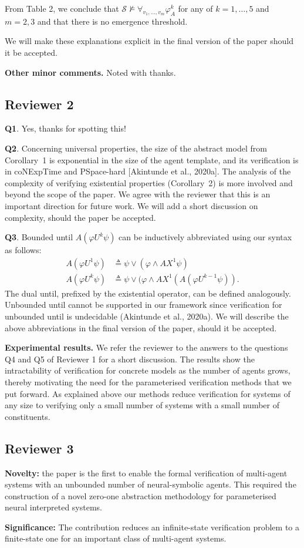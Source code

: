 \documentclass{article}
\begin{document}
From Table 2, we conclude that
$\mathcal{S}\not\models\forall_{v_1,\dots,v_m}\varphi^k_A$ for any of
$k=1,\dots,5$ and $m=2,3$ and that there is no emergence threshold.

We will make these explanations explicit in the final
version of the paper should it be accepted.

\textbf{Other minor comments.} Noted with thanks.


\subsection*{Reviewer 2}

\textbf{Q1}. Yes, thanks for spotting this!

\noindent
\textbf{Q2}.  
Concerning universal properties, the size of the abstract model from
Corollary~1  is exponential in the size of the agent template, and its
verification is in {\sc coNExpTime} and {\sc PSpace-hard} [Akintunde et al.,
2020a]. The analysis of the complexity of verifying existential properties
(Corollary~2) is more involved and beyond the scope of the paper. We agree with
the reviewer  that this is an important direction for future work.  
We will add a short discussion on complexity, should the
paper be accepted.

\noindent
\textbf{Q3}. Bounded until $A(\varphi U^k \psi)$ can be inductively abbreviated
using our syntax as follows:
 \begin{align*}
  A(\varphi U^1 \psi) &\triangleq \psi \lor (\varphi \land AX^1 \psi) \\
  A(\varphi U^k \psi) &\triangleq \psi \lor (\varphi \land AX^1 (A (\varphi U^{k-1} \psi)).
 \end{align*}
The dual until, prefixed by the existential operator, can be defined
analogously. Unbounded until cannot be supported in our framework since
verification for unbounded until is undecidable (Akintunde et al., 2020a). We
will describe the above abbreviations in the final version of  the paper,
should it be accepted.

\textbf{Experimental results.} We refer the reviewer to the answers to the
questions Q4 and Q5 of Reviewer 1 for a short discussion. The results show the
intractability of verification for concrete models as the number of agents
grows, thereby motivating the need for the parameterised verification methods
that we put forward. As explained above our methods reduce verification for
systems of any size to verifying only a small number of systems with a small
number of constituents.


\subsection*{Reviewer 3}

\textbf{Novelty:} the paper is the first to enable the formal verification of
multi-agent systems with an unbounded number of neural-symbolic agents. This
required the construction of a novel zero-one abstraction methodology for
parameterised neural interpreted systems.

\noindent
\textbf{Significance:} The contribution reduces an  infinite-state verification
problem to a finite-state one for an important class of multi-agent systems.
\end{document}
